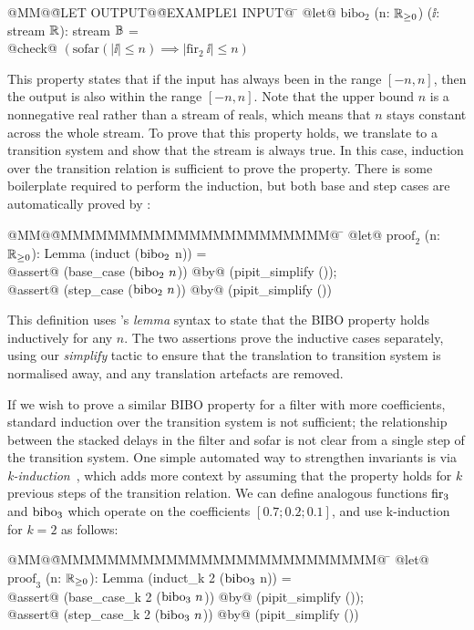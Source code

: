 \documentclass[sigplan,screen, review]{acmart}
\begin{document}
\begin{tabbing}
  @MM@\= @LET OUTPUT@\= @EXAMPLE1 INPUT@ \= \kill
  @let@ $\mbox{bibo}_2$ (n: $\mathbb{R}_{\ge0}$) ($\ii$: stream $\mathbb{R}$): stream $\mathbb{B}$ = \\
  \> @check@ $(\mbox{sofar}(|\ii| \le n) \implies |\mbox{fir}_2~\ii| \le n)$
\end{tabbing}

This property states that if the input has always been in the range $[-n, n]$, then the output is also within the range $[-n, n]$.
Note that the upper bound $n$ is a nonnegative real rather than a stream of reals, which means that $n$ stays constant across the whole stream.
To prove that this property holds, we translate to a transition system and show that the stream is always true.
In this case, induction over the transition relation is sufficient to prove the property.
There is some boilerplate required to perform the induction, but both base and step cases are automatically proved by \fstar{}:

\begin{tabbing}
  @MM@\= @MMMMMMMMMMMMMMMMMMMMMMM@ \= \kill
  @let@ $\mbox{proof}_2$ (n: $\mathbb{R}_{\ge0}$): Lemma (induct ($\mbox{bibo}_2$ n)) = \\
  \> @assert@ (base\_case ($\mbox{bibo}_2 ~n$)) \> @by@ (pipit\_simplify ()); \\
  \> @assert@ (step\_case ($\mbox{bibo}_2 ~n$)) \> @by@ (pipit\_simplify ())
\end{tabbing}

This definition uses \fstar{}'s \emph{lemma} syntax to state that the BIBO property holds inductively for any $n$.
The two assertions prove the inductive cases separately, using our \emph{simplify} tactic to ensure that the translation to transition system is normalised away, and any translation artefacts are removed.

If we wish to prove a similar BIBO property for a filter with more coefficients, standard induction over the transition system is not sufficient; the relationship between the stacked delays in the filter and sofar is not clear from a single step of the transition system.
One simple automated way to strengthen invariants is via \emph{k-induction}~\cite{hagen2008scaling}, which adds more context by assuming that the property holds for $k$ previous steps of the transition relation.
We can define analogous functions $\mbox{fir}_3$ and $\mbox{bibo}_3$ which operate on the coefficients $[0.7; 0.2; 0.1]$, and use k-induction for $k = 2$ as follows:

\begin{tabbing}
  @MM@\= @MMMMMMMMMMMMMMMMMMMMMMMMMMM@ \= \kill
  @let@ $\mbox{proof}_3$ (n: $\mathbb{R}_{\ge0}$): Lemma (induct\_k 2 ($\mbox{bibo}_3$ n)) = \\
  \> @assert@ (base\_case\_k 2 ($\mbox{bibo}_3 ~n$)) \> @by@ (pipit\_simplify ()); \\
  \> @assert@ (step\_case\_k 2 ($\mbox{bibo}_3 ~n$)) \> @by@ (pipit\_simplify ())
\end{tabbing}
\end{document}
